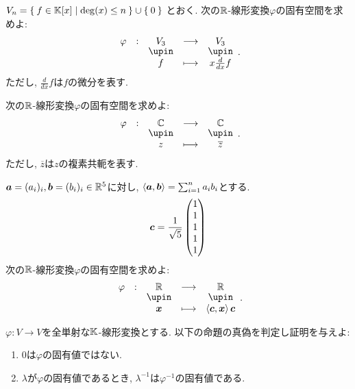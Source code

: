 \begin{quiz}
  $V_n=\Set{f\in \mathbb{K}[x] |\deg(x) \leq n}\cup\Set{0}$
  とおく.
  次の$\mathbb{R}$-線形変換$\varphi$の固有空間を求めよ:
  \begin{align*}
    \shazo{\varphi}{V_3}{V_3}
    {f}{x\frac{d}{dx}f}.
  \end{align*}
  ただし, $\frac{d}{dx}f$は$f$の微分を表す.
\end{quiz}

\begin{quiz}
  次の$\mathbb{R}$-線形変換$\varphi$の固有空間を求めよ:
  \begin{align*}
    \shazo{\varphi}{\CC}{\CC}
    {z}{\overline{z}}.
  \end{align*}
  ただし, $\overline{z}$は$z$の複素共軛を表す.
\end{quiz}

\begin{quiz}
  $\boldsymbol{a}=(a_i)_{i}, \boldsymbol{b}=(b_i)_i \in \mathbb{R}^5$に対し,
  $\Braket{\boldsymbol{a},\boldsymbol{b}}=\sum_{i=1}^na_ib_i$とする.
  \begin{align*}
    \boldsymbol{c}=\frac{1}{\sqrt 5}\begin{pmatrix}1\\1\\1\\1\\1\end{pmatrix}
  \end{align*}  
  次の$\mathbb{R}$-線形変換$\varphi$の固有空間を求めよ:
  \begin{align*}
    \shazo{\varphi}{\RR}{\RR}
    {\xx}{\Braket{\ccc,\xx}\ccc}.
  \end{align*}
\end{quiz}



\begin{quiz}
  $\varphi\colon V\to V$を全単射な$\mathbb{K}$-線形変換とする.
  以下の命題の真偽を判定し証明を与えよ:
  \begin{enumerate}
  \item
      $0$は$\varphi$の固有値ではない.
  \item
  $\lambda$が$\varphi$の固有値であるとき,
    $\lambda^{-1}$は$\varphi^{-1}$の固有値である.
  \end{enumerate}
\end{quiz}


